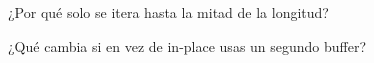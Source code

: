 
\begin{DoxyEnumerate}
\item ¿\+Por qué solo se itera hasta la mitad de la longitud?
\item ¿\+Qué cambia si en vez de in-\/place usas un segundo buffer? 
\end{DoxyEnumerate}